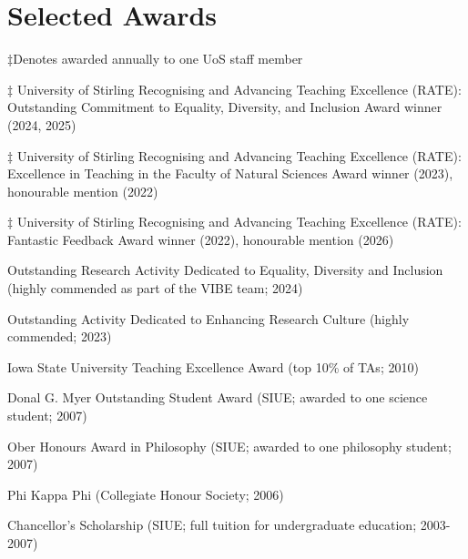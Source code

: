 \documentclass[letterpaper]{article}
\renewenvironment{itemize}{
  \begin{list}{}{
    \setlength{\leftmargin}{1.5em}
  }
}{
  \end{list}
}
\begin{document}
\section*{Selected Awards}
\begin{itemize}
\item $\ddagger$Denotes awarded annually to one UoS staff member
\item $\ddagger$ University of Stirling Recognising and Advancing Teaching Excellence (RATE): Outstanding Commitment to Equality, Diversity, and Inclusion Award winner (2024, 2025)
\item $\ddagger$ University of Stirling Recognising and Advancing Teaching Excellence (RATE): Excellence in Teaching in the Faculty of Natural Sciences Award winner (2023), honourable mention (2022)
\item $\ddagger$ University of Stirling Recognising and Advancing Teaching Excellence (RATE): Fantastic Feedback Award winner (2022), honourable mention (2026)
\item Outstanding Research Activity Dedicated to Equality, Diversity and Inclusion (highly commended as part of the VIBE team; 2024)
\item Outstanding Activity Dedicated to Enhancing Research Culture (highly commended; 2023)
\item Iowa State University Teaching Excellence Award (top 10\% of TAs; 2010)
\item Donal G. Myer Outstanding Student Award (SIUE; awarded to one science student; 2007)
\item Ober Honours Award in Philosophy (SIUE; awarded to one philosophy student; 2007)
\item Phi Kappa Phi (Collegiate Honour Society; 2006)
\item Chancellor's Scholarship (SIUE; full tuition for undergraduate education; 2003-2007)
\end{itemize}
\end{document}
